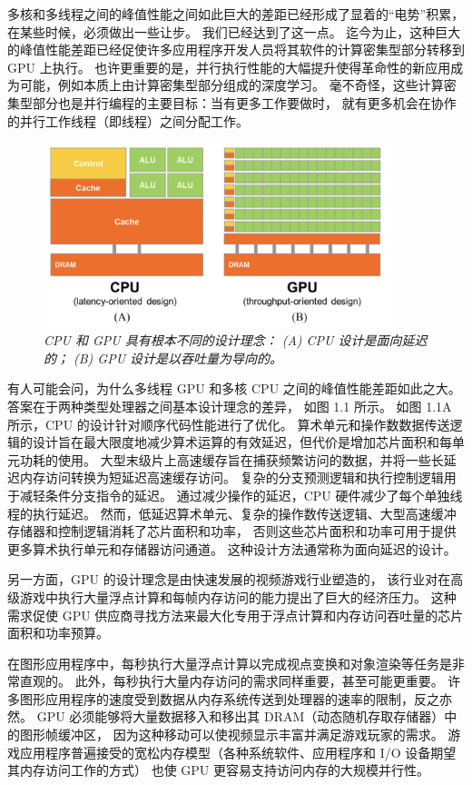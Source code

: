 多核和多线程之间的峰值性能之间如此巨大的差距已经形成了显着的“电势”积累，在某些时候，必须做出一些让步。 
我们已经达到了这一点。 迄今为止，这种巨大的峰值性能差距已经促使许多应用程序开发人员将其软件的计算密集型部分转移到 
GPU 上执行。 也许更重要的是，并行执行性能的大幅提升使得革命性的新应用成为可能，例如本质上由计算密集型部分组成的深度学习。 
毫不奇怪，这些计算密集型部分也是并行编程的主要目标：当有更多工作要做时，
就有更多机会在协作的并行工作线程（即线程）之间分配工作。
\begin{figure}[H]
	\centering
	\includegraphics[width=0.9\textwidth]{figs/F1.1.png}
	\caption{\textit{CPU 和 GPU 具有根本不同的设计理念： (A) CPU 设计是面向延迟的；
	 (B) GPU 设计是以吞吐量为导向的。}}
\end{figure}

有人可能会问，为什么多线程 GPU 和多核 CPU 之间的峰值性能差距如此之大。 答案在于两种类型处理器之间基本设计理念的差异，
如图 1.1 所示。 如图 1.1A 所示，CPU 的设计针对顺序代码性能进行了优化。 
算术单元和操作数数据传送逻辑的设计旨在最大限度地减少算术运算的有效延迟，但代价是增加芯片面积和每单元功耗的使用。 
大型末级片上高速缓存旨在捕获频繁访问的数据，并将一些长延迟内存访问转换为短延迟高速缓存访问。 
复杂的分支预测逻辑和执行控制逻辑用于减轻条件分支指令的延迟。 通过减少操作的延迟，CPU 硬件减少了每个单独线程的执行延迟。 
然而，低延迟算术单元、复杂的操作数传送逻辑、大型高速缓冲存储器和控制逻辑消耗了芯片面积和功率，
否则这些芯片面积和功率可用于提供更多算术执行单元和存储器访问通道。 这种设计方法通常称为面向延迟的设计。

另一方面，GPU 的设计理念是由快速发展的视频游戏行业塑造的，
该行业对在高级游戏中执行大量浮点计算和每帧内存访问的能力提出了巨大的经济压力。 
这种需求促使 GPU 供应商寻找方法来最大化专用于浮点计算和内存访问吞吐量的芯片面积和功率预算。

在图形应用程序中，每秒执行大量浮点计算以完成视点变换和对象渲染等任务是非常直观的。 
此外，每秒执行大量内存访问的需求同样重要，甚至可能更重要。 
许多图形应用程序的速度受到数据从内存系统传送到处理器的速率的限制，反之亦然。 
GPU 必须能够将大量数据移入和移出其 DRAM（动态随机存取存储器）中的图形帧缓冲区，
因为这种移动可以使视频显示丰富并满足游戏玩家的需求。 
游戏应用程序普遍接受的宽松内存模型（各种系统软件、应用程序和 I/O 设备期望其内存访问工作的方式）
也使 GPU 更容易支持访问内存的大规模并行性。


